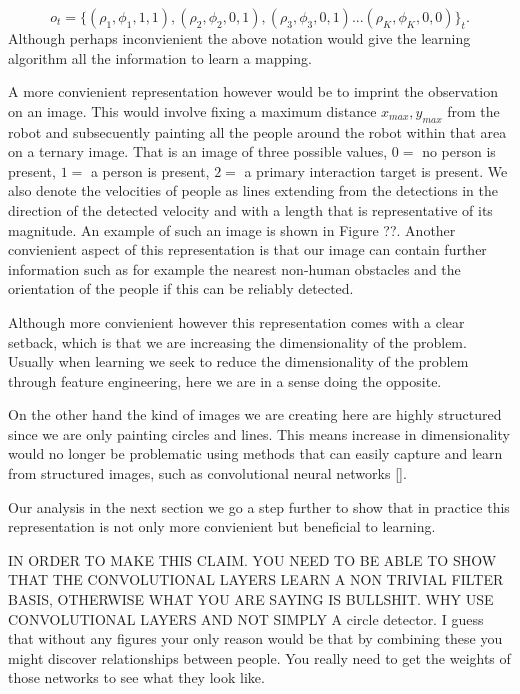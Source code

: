 \documentclass[letterpaper, 10 pt, conference]{ieeeconf}
\begin{document}
\begin{equation}
 	o_t = \{(\rho_1,\phi_1,1,1), (\rho_2,\phi_2,0,1),(\rho_3,\phi_3,0,1) ... (\rho_{K},\phi_{K},0,0)\}_t.
\end{equation}
Although perhaps inconvienient the above notation would give the learning algorithm all the information to learn a mapping. 

A more convienient representation however would be to imprint the observation on an image. This would involve fixing a maximum distance $x_{max},y_{max}$ from the robot and subsecuently painting all the people around the robot within that area on a ternary image. That is an image of three possible values, $0=$ no person is present, $1=$ a person is present, $2=$ a primary interaction target is present. We also denote the velocities of people as lines extending from the detections in the direction of the detected velocity and with a length that is representative of its magnitude. An example of such an image is shown in Figure ??. Another convienient aspect of this representation is that our image can contain further information such as for example the nearest non-human obstacles and the orientation of the people if this can be reliably detected. 

Although more convienient however this representation comes with a clear setback, which is that we are increasing the dimensionality of the problem. Usually when learning we seek to reduce the dimensionality of the problem through feature engineering, here we are in a sense doing the opposite. 

On the other hand the kind of images we are creating here are highly structured since we are only painting circles and lines. This means increase in dimensionality would no longer be problematic using methods that can easily capture and learn from structured images, such as convolutional neural networks []. 

Our analysis in the next section we go a step further to show that in practice this representation is not only more convienient but beneficial to learning.

IN ORDER TO MAKE THIS CLAIM. YOU NEED TO BE ABLE TO SHOW THAT THE CONVOLUTIONAL LAYERS LEARN A NON TRIVIAL FILTER BASIS, OTHERWISE WHAT YOU ARE SAYING IS BULLSHIT. WHY USE CONVOLUTIONAL LAYERS AND NOT SIMPLY A circle detector. I guess that without any figures your only reason would be that by combining these you might discover relationships between people. You really need to get the weights of those networks to see what they look like.  
\end{document}
